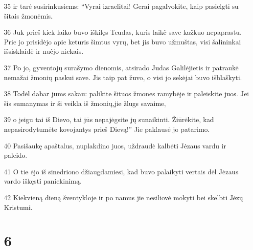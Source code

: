 \par 35 ir tarė susirinkusiems: “Vyrai izraelitai! Gerai pagalvokite, kaip pasielgti su šitais žmonėmis. 
\par 36 Juk prieš kiek laiko buvo iškilęs Teudas, kuris laikė save kažkuo nepaprastu. Prie jo prisidėjo apie keturis šimtus vyrų, bet jis buvo užmuštas, visi šalininkai išsisklaidė ir nuėjo niekais. 
\par 37 Po jo, gyventojų surašymo dienomis, atsirado Judas Galilėjietis ir patraukė nemažai žmonių paskui save. Jis taip pat žuvo, o visi jo sekėjai buvo išblaškyti. 
\par 38 Todėl dabar jums sakau: palikite šituos žmones ramybėje ir paleiskite juos. Jei šis sumanymas ir ši veikla iš žmonių,­jie žlugs savaime, 
\par 39 o jeigu tai iš Dievo, tai jūs nepajėgsite jų sunaikinti. Žiūrėkite, kad nepasirodytumėte kovojantys prieš Dievą!” Jie paklausė jo patarimo. 
\par 40 Pasišaukę apaštalus, nuplakdino juos, uždraudė kalbėti Jėzaus vardu ir paleido. 
\par 41 O tie ėjo iš sinedriono džiaugdamiesi, kad buvo palaikyti vertais dėl Jėzaus vardo iškęsti paniekinimą. 
\par 42 Kiekvieną dieną šventykloje ir po namus jie nesiliovė mokyti bei skelbti Jėzų Kristumi.


\chapter{6}


